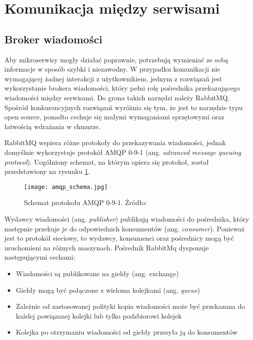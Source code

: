 \newpage
\section{Komunikacja między serwisami}
\subsection{Broker wiadomości}
Aby mikroserwisy mogły działać poprawnie, potrzebują wymieniać ze sobą informacje 
w sposób szybki i niezawodny. W przypadku komunikacji nie wymagającej żadnej interakcji 
z użytkownikiem, jednym z rozwiązań jest wykorzystanie brokera wiadomości, który pełni 
rolę pośrednika przekazującego wiadomości między serwisami. Do grona takich narzędzi 
należy RabbitMQ. Spośród konkurencyjnych rozwiązań wyróżnia się tym, że jest to 
narzędzie typu open source, ponadto cechuje się małymi wymaganiami sprzętowymi oraz 
łatwością wdrażania w chmurze. 

RabbitMQ wspiera różne protokoły do przekazywania wiadomości, jednak domyślnie 
wykorzystuje protokół AMQP 0-9-1 (ang. \textit{advanced message queuing protocol}). Uogólniony 
schemat, na którym opiera się protokoł, został przedstawiony na rysunku \ref{fig:schemat-amqp}.

\begin{figure}[h]
    \centering
    \texttt{[image: amqp\_schema.jpg]}
    \caption{Schemat protokołu AMQP 0-9-1. Źródło: \cite{rabbitmq2022}}
    \label{fig:schemat-amqp}
\end{figure}

Wydawcy wiadomości (ang. \textit{publisher}) publikują wiadomości do pośrednika, który następnie 
przekuje je do odpowiednich konsumentów (ang. \textit{consumer}). Ponieważ jest to protokół 
sieciowy, to wydawcy, konsumenci oraz pośrednicy mogą być uruchomieni na różnych 
maszynach. Pośrednik RabbitMq dysponuje następującymi cechami:

\begin{itemize} %
    \item Wiadomości są publikowane na giełdy (ang. exchange)
    \item Giełdy mogą być połączone z wieloma kolejkami (ang. \textit{queue})
    \item Zależnie od zastosowanej polityki kopia wiadomości może być przekazana do 
    każdej powiązanej kolejki lub tylko podzbiorowi kolejek
    \item Kolejka po otrzymaniu wiadomości od giełdy przesyła ją do konsumentów
\end{itemize}


